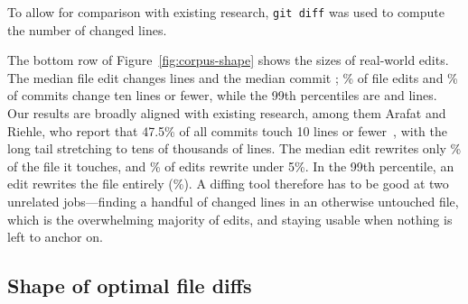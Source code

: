\documentclass[sigconf]{acmart}
\begin{document}
To allow for comparison with existing research, \texttt{git diff} was used to compute the number of
changed lines.


The bottom row of Figure~\ref{fig:corpus-shape} shows the sizes of real-world edits. The
median file edit changes \EditsLinesPerFilePFifty{} lines and the median commit
\EditsLinesPerCommitPFifty{}; \EditsFileEditsUnderTenPct{}\% of file edits and
\EditsCommitsUnderTenPct{}\% of commits change ten lines or fewer, while the 99th percentiles are
\EditsLinesPerFilePNinetyNine{} and \EditsLinesPerCommitPNinetyNine{} lines. Our results are
broadly aligned with existing research, among them Arafat and Riehle, who report that 47.5\% of
all commits touch 10 lines or fewer~\cite{commit-size-distribution-paper}, with the long tail
stretching to tens of thousands of lines. The median edit rewrites only
\EditsChurnPFiftyPct{}\% of the file it touches, and \EditsChurnUnderFivePct{}\% of edits rewrite
under 5\%. In the 99th percentile, an edit rewrites the file entirely
(\EditsChurnPNinetyNinePct{}\%). A diffing tool therefore has to be good at two
unrelated jobs---finding a handful of changed lines in an otherwise untouched file, which is the
overwhelming majority of edits, and staying usable when nothing is left to anchor on.

\subsection{Shape of optimal file diffs}
\label{sec:diff-shape}
\end{document}

